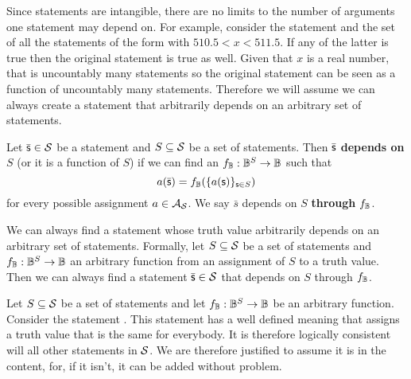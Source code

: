\documentclass[11pt,letterpaper,fleqn]{memoir} %
\begin{document}
Since statements are intangible, there are no limits to the number of arguments one statement may depend on. For example, consider the statement  and the set of all the statements of the form  with $510.5 < x < 511.5$. If any of the latter is true then the original statement is true as well. Given that $x$ is a real number, that is uncountably many statements so the original statement can be seen as a function of uncountably many statements. Therefore we will assume we can always create a statement that arbitrarily depends on an arbitrary set of statements.

\begin{mathSection}
	\begin{defn}\label{def_dependence}
	Let $\bar{\mathsf{s}} \in \mathcal{S}$ be a statement and $S \subseteq \mathcal{S}$ be a set of statements. Then $\bar{\mathsf{s}}$ \textbf{depends on} $S$ (or it is a function of $S$)  if we can find an $f_{\mathbb{B}} : \mathbb{B}^S \to \mathbb{B}$ such that
	$$a(\bar{\mathsf{s}}) = f_{\mathbb{B}} (\{a(\mathsf{s})\}_{\mathsf{s} \in S})$$
	for every possible assignment $a \in \mathcal{A}_{\mathcal{S}}$. We say $\bar{s}$ depends on $S$ \textbf{through} $f_{\mathbb{B}}$.
\end{defn}

	\begin{axiom}\label{ax_functions_of_statement}
		We can always find a statement whose truth value arbitrarily depends on an arbitrary set of statements. Formally, let $S \subseteq \mathcal{S}$ be a set of statements and $f_{\mathbb{B}} : \mathbb{B}^S \to \mathbb{B}$ an arbitrary function from an assignment of $S$ to a truth value. Then we can always find a statement $\bar{\mathsf{s}} \in \mathcal{S}$ that depends on $S$ through $f_{\mathbb{B}}$.
	\end{axiom}
\begin{justification}
	Let $S \subseteq \mathcal{S}$ be a set of statements and let $f_{\mathbb{B}} : \mathbb{B}^S \to \mathbb{B}$ be an arbitrary function. Consider the statement . This statement has a well defined meaning that assigns a truth value that is the same for everybody. It is therefore logically consistent will all other statements in $\mathcal{S}$. We are therefore justified to assume it is in the content, for, if it isn't, it can be added without problem. 
\end{justification}


\end{mathSection}
\end{document}
